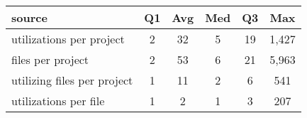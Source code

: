 \begin{center}
\begin{tabular}{l|ccccc}
\toprule
source & Q1 & Avg & Med & Q3 & Max \\ 
\midrule
utilizations per project & 2 & 32 & 5 & 19 & 1,427 \\ 
\midrule
files per project & 2 & 53 & 6 & 21 & 5,963 \\ 
\midrule
utilizing files per project & 1 & 11 & 2 & 6 & 541 \\ 
\midrule
utilizations per file & 1 & 2 & 1 & 3 & 207 \\ 
\bottomrule
\end{tabular}
\end{center}
